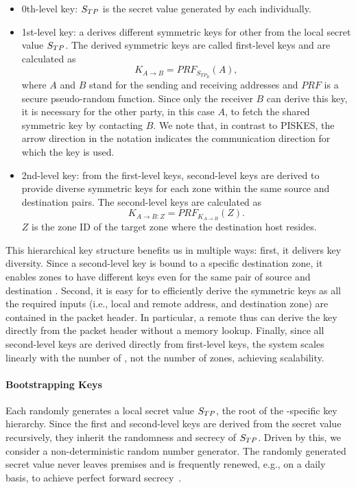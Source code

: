 \begin{itemize}
	\item 0th-level key: $S_{TP}$ is the secret value generated by each \tp individually.
	\item 1st-level key: a \tp derives different symmetric keys for other \tps from the
	      local secret value $S_{TP}$. The derived symmetric keys are called first-level keys and
	      are calculated as
	      \begin{equation}
	      	K_{A \rightarrow B} = PRF_{S_{{TP}_B}}(A),
	      	\label{eq:1stkey}
	      \end{equation}
	      where $A$ and $B$ stand for the sending and receiving \tp addresses and $PRF$ is a secure pseudo-random 
	      function. Since only the receiver $B$ can derive this key, it is necessary for 
	      the other party, in this case $A$, to fetch the shared symmetric key by contacting 
	      $B$. We note that, in contrast to PISKES, the arrow direction
	      in the notation indicates the communication direction for which the key is used.
	\item 2nd-level key: from the first-level keys, second-level keys are derived to
	      provide diverse symmetric keys for each zone within the same source and destination
	      \tp pairs. The second-level keys are calculated as
	      \begin{equation}
	      	K_{A \rightarrow B:Z} = PRF_{K_{A \rightarrow B}}(Z).
	      	\label{eq:2ndkey}
	      \end{equation}
	      $Z$ is the zone ID of the target zone where the destination host resides.
\end{itemize}

This hierarchical key structure benefits us in multiple ways: first, it delivers
key diversity. Since a second-level key is bound to a specific destination zone, it enables 
zones to have different keys even for the same pair of source and destination \tps. 
Second, it is easy for \tps to efficiently derive the symmetric keys as all the
required inputs (i.e., local and remote \tp address, and 
destination zone) are contained in the packet header. In particular, a remote \tp 
thus can derive the key directly from the packet header without a memory lookup.
Finally, since all second-level keys are derived directly from first-level keys,
the system scales linearly with the number of \tps, not the number of zones, achieving scalability.

\paragraph{Bootstrapping Keys}
Each \tp randomly generates a local secret value $S_{TP}$, the root of the \tp-specific
key hierarchy. Since the first and second-level keys are derived from the secret value
recursively, they inherit the randomness and secrecy of $S_{TP}$. Driven by this, we
consider a non-deterministic random number generator. The randomly generated secret value
never leaves \tp premises and is frequently renewed, e.g., on a daily basis, to achieve
perfect forward secrecy~\cite{rfc1363}.


